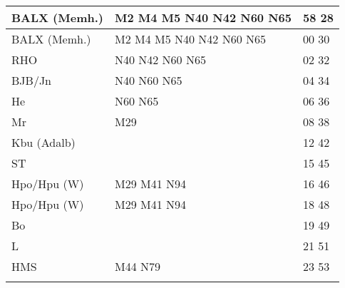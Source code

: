 \begin{tabular}{!{\color{schiefergrau}\vrule width 3pt}*{3}{l!{\color{schiefergrau}\vrule width 3pt}}}
BALX (Memh.) & \nuzwei{} \nufuenf{} \mtram{} M2 M4 M5 \nbus{} N40 N42 N60 N65 & 58 28 \\
\hline
BALX (Memh.) & \nuzwei{} \nufuenf{} \mtram{} M2 M4 M5 \nbus{} N40 N42 N60 N65 & 00 30 \\
RHO          & \nuzwei{} \nbus{} N40 N42 N60 N65                              & 02 32 \\
BJB/Jn       & \nbus{} N40 N60 N65                                            & 04 34 \\
He           & \nbus{} N60 N65                                                & 06 36 \\
Mr           & \mbus{} M29                                                    & 08 38 \\
Kbu (Adalb)  & \nueins{}                                                      & 12 42 \\
ST           &                                                                & 15 45 \\
Hpo/Hpu (W)  & \nusieben{} \mbus{} M29 M41 \nbus{} N94                        & 16 46 \\
\hline
Hpo/Hpu (W)  & \nusieben{} \mbus{} M29 M41 \nbus{} N94                        & 18 48 \\
Bo           &                                                                & 19 49 \\
L            &                                                                & 21 51 \\
HMS          & \mbus{} M44 \nbus{} N79                                        & 23 53 \\
\myhline
\end{tabular}
%

